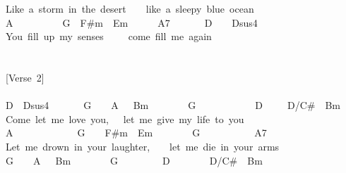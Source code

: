 \documentclass[]{book}
\begin{document}
Like~a~storm~in~the~desert~~~~like~a~sleepy~blue~ocean\\
\hspace*{0.333em}\hspace*{0.333em}\hspace*{0.333em}\hspace*{0.333em}A~~~~~~~~~~G~~F\#m~~Em~~~~~~A7~~~~~~~D~~~~Dsus4\\
You~fill~up~my~senses~~~~~come~fill~me~again\\
~\\
~\\
{[}Verse~2{]}\\
~\\
D~~Dsus4~~~~~~~G~~~~A~~~Bm~~~~~~~~G~~~~~~~~~~~~D~~~~~D/C\#~~Bm\\
\hspace*{0.333em}\hspace*{0.333em}\hspace*{0.333em}Come~let~me~love~you,~~~let~me~give~my~life~to~you\\
\hspace*{0.333em}\hspace*{0.333em}\hspace*{0.333em}\hspace*{0.333em}\hspace*{0.333em}\hspace*{0.333em}\hspace*{0.333em}A~~~~~~~~~~~~~G~~~~F\#m~~Em~~~~~~~~G~~~~~~~~~~~A7\\
Let~me~drown~in~your~laughter,~~~~let~me~die~in~your~arms\\
\hspace*{0.333em}\hspace*{0.333em}\hspace*{0.333em}\hspace*{0.333em}\hspace*{0.333em}\hspace*{0.333em}\hspace*{0.333em}\hspace*{0.333em}\hspace*{0.333em}\hspace*{0.333em}\hspace*{0.333em}\hspace*{0.333em}\hspace*{0.333em}\hspace*{0.333em}\hspace*{0.333em}\hspace*{0.333em}\hspace*{0.333em}\hspace*{0.333em}G~~~~A~~~Bm~~~~~~~~G~~~~~~~~~D~~~~~~~~D/C\#~~Bm\\
\end{document}
